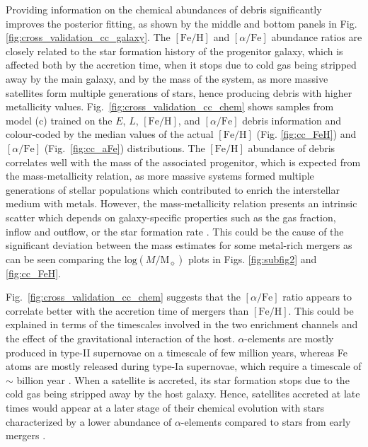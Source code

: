 Providing information on the chemical abundances of debris significantly improves the posterior fitting, as shown by the middle and bottom panels in Fig. \ref{fig:cross_validation_cc_galaxy}. The $[\mathrm{Fe}/\mathrm{H}]$ and $[\alpha/\mathrm{Fe}]$ abundance ratios are closely related to the star formation history of the progenitor galaxy, which is affected both by the accretion time, when it stops due to cold gas being stripped away by the main galaxy, and by the mass of the system, as more massive satellites form multiple generations of stars, hence producing debris with higher metallicity values. Fig.~\ref{fig:cross_validation_cc_chem} shows samples from model (c) trained on the $E$, $L$, $[\mathrm{Fe}/\mathrm{H}]$, and $[\alpha/\mathrm{Fe}]$ debris information and colour-coded by the median values of the actual $[\mathrm{Fe}/\mathrm{H}]$ (Fig. \ref{fig:cc_FeH}) and $[\alpha/\mathrm{Fe}]$ (Fig.~\ref{fig:cc_aFe}) distributions. The $[\mathrm{Fe}/\mathrm{H}]$ abundance of debris correlates well with the mass of the associated progenitor, which is expected from the mass-metallicity relation, as more massive systems formed multiple generations of stellar populations which contributed to enrich the interstellar medium with metals. However, the mass-metallicity relation presents an intrinsic scatter which depends on galaxy-specific properties such as the gas fraction, inflow and outflow, or the star formation rate \citep{vanLoon2021}. This could be the cause of the significant deviation between the mass estimates for some metal-rich mergers as can be seen comparing the $\mathrm{log}(M/\mathrm{M}_{\sun})$ plots in Figs. \ref{fig:subfig2} and \ref{fig:cc_FeH}. 

Fig.~\ref{fig:cross_validation_cc_chem} suggests that the $[\alpha/\mathrm{Fe}]$ ratio appears to correlate better with the accretion time of mergers than $[\mathrm{Fe}/\mathrm{H}]$. This could be explained in terms of the timescales involved in the two enrichment channels and the effect of the gravitational interaction of the host.  $\alpha$-elements are mostly produced in type-II supernovae on a timescale of few million years, whereas Fe atoms are mostly released during type-Ia supernovae, which require a timescale of  $\sim$ billion year \citep{McWilliam1997}. When a satellite is accreted, its star formation stops due to the cold gas being stripped away by the host galaxy. Hence,  satellites accreted at late times would appear at a later stage of their chemical evolution with stars characterized by a lower abundance of $\alpha$-elements compared to stars from early mergers \citep{Font2006a}.
 

